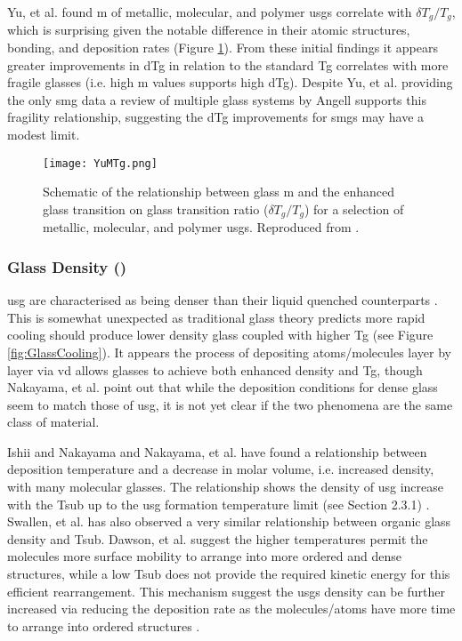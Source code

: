 \documentclass[a4paper,12pt,oneside]{report}%
\begin{document}
Yu, et al. \cite{Yu2013} found \gls{m} of metallic, molecular, and polymer \glspl{usg} correlate with $\delta T_{g}/T_{g}$, which is surprising given the notable difference in their atomic structures, bonding, and deposition rates (Figure \ref{fig:YuMTgPlot}). From these initial findings it appears greater improvements in \gls{dTg} in relation to the standard \gls{Tg} correlates with more fragile glasses (i.e. high m values supports high \gls{dTg}). Despite Yu, et al. \cite{Yu2013} providing the only \gls{smg} data a review of multiple glass systems by Angell \cite{Angell2014} supports this fragility relationship, suggesting the \gls{dTg} improvements for \glspl{smg} may have a modest limit. 

\begin{figure}[htb]
	\centering
	\texttt{[image: YuMTg.png]}
	\caption[Schematic of the relationship between glass \gls{m} and the enhanced glass transition on glass transition ratio ($\delta T_{g}/T_{g}$) for a selection of metallic, molecular, and polymer \acrshort{usg}s.]{Schematic of the relationship between glass \gls{m} and the enhanced glass transition on glass transition ratio ($\delta T_{g}/T_{g}$) for a selection of metallic, molecular, and polymer \acrshort{usg}s. Reproduced from \cite{Yu2013}.}
	\label{fig:YuMTgPlot}
\end{figure}

\subsubsection{Glass Density (\p)} 
\Gls{usg} are characterised as being denser than their liquid quenched counterparts \cite{Wang2014}. This is somewhat unexpected as traditional glass theory predicts more rapid cooling should produce lower density glass coupled with higher \gls{Tg} (see Figure \ref{fig:GlassCooling}). It appears the process of depositing atoms/molecules layer by layer via \gls{vd} allows glasses to achieve both enhanced density and \gls{Tg}, though Nakayama, et al. \cite{Nakayama2013} point out that while the deposition conditions for dense glass seem to match those of \gls{usg}, it is not yet clear if the two phenomena are the same class of material.

Ishii and Nakayama \cite{Ishii2014} and Nakayama, et al. \cite{Nakayama2013} have found a relationship between deposition temperature and a decrease in molar volume, i.e. increased density, with many molecular glasses. The relationship shows the density of \gls{usg} increase with the \gls{Tsub} up to the \gls{usg} formation temperature limit (see Section 2.3.1) \cite{Ishii2014, Nakayama2013}. Swallen, et al. \cite{Swallen2007} has also observed a very similar relationship between organic glass density and \gls{Tsub}. Dawson, et al. \cite{Dawson2010} suggest the higher temperatures permit the molecules more surface mobility to arrange into more ordered and dense structures, while a low \gls{Tsub} does not provide the required kinetic energy for this efficient rearrangement. This mechanism suggest the \glspl{usg} density can be further increased via reducing the deposition rate as the molecules/atoms have more time to arrange into ordered structures \cite{Dawson2010}.
\end{document}
